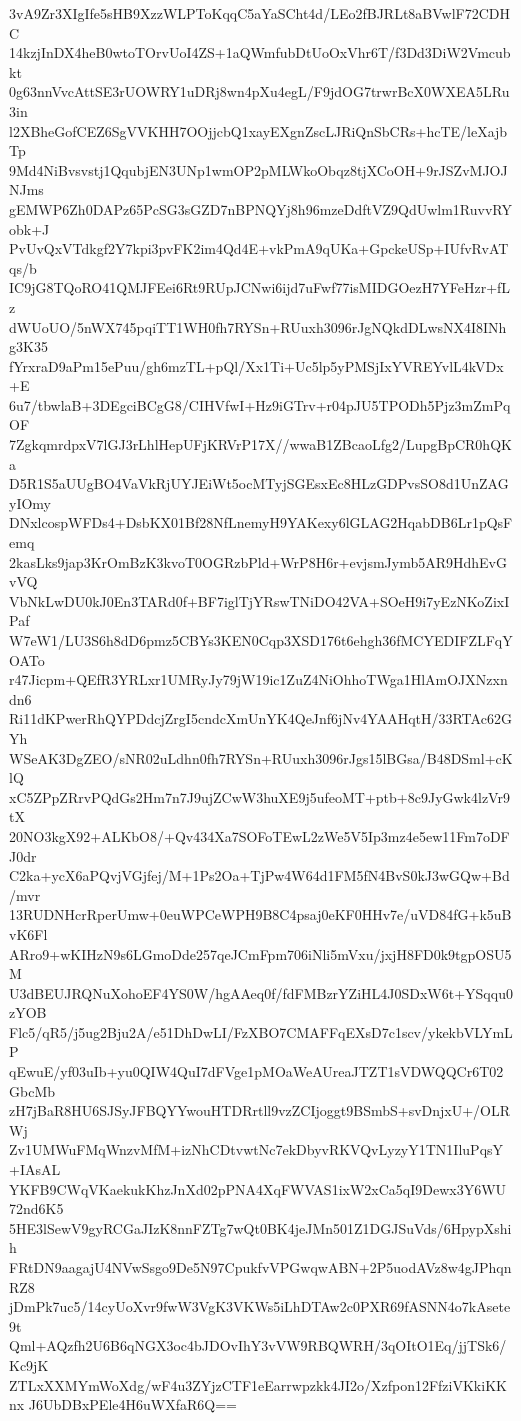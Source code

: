 3vA9Zr3XIgIfe5sHB9XzzWLPToKqqC5aYaSCht4d/LEo2fBJRLt8aBVwlF72CDHC
14kzjInDX4heB0wtoTOrvUoI4ZS+1aQWmfubDtUoOxVhr6T/f3Dd3DiW2Vmcubkt
0g63nnVvcAttSE3rUOWRY1uDRj8wn4pXu4egL/F9jdOG7trwrBcX0WXEA5LRu3in
l2XBheGofCEZ6SgVVKHH7OOjjcbQ1xayEXgnZscLJRiQnSbCRs+hcTE/leXajbTp
9Md4NiBvsvstj1QqubjEN3UNp1wmOP2pMLWkoObqz8tjXCoOH+9rJSZvMJOJNJms
gEMWP6Zh0DAPz65PcSG3sGZD7nBPNQYj8h96mzeDdftVZ9QdUwlm1RuvvRYobk+J
PvUvQxVTdkgf2Y7kpi3pvFK2im4Qd4E+vkPmA9qUKa+GpckeUSp+IUfvRvATqs/b
IC9jG8TQoRO41QMJFEei6Rt9RUpJCNwi6ijd7uFwf77isMIDGOezH7YFeHzr+fLz
dWUoUO/5nWX745pqiTT1WH0fh7RYSn+RUuxh3096rJgNQkdDLwsNX4I8INhg3K35
fYrxraD9aPm15ePuu/gh6mzTL+pQl/Xx1Ti+Uc5lp5yPMSjIxYVREYvlL4kVDx+E
6u7/tbwlaB+3DEgciBCgG8/CIHVfwI+Hz9iGTrv+r04pJU5TPODh5Pjz3mZmPqOF
7ZgkqmrdpxV7lGJ3rLhlHepUFjKRVrP17X//wwaB1ZBcaoLfg2/LupgBpCR0hQKa
D5R1S5aUUgBO4VaVkRjUYJEiWt5ocMTyjSGEsxEc8HLzGDPvsSO8d1UnZAGyIOmy
DNxlcospWFDs4+DsbKX01Bf28NfLnemyH9YAKexy6lGLAG2HqabDB6Lr1pQsFemq
2kasLks9jap3KrOmBzK3kvoT0OGRzbPld+WrP8H6r+evjsmJymb5AR9HdhEvGvVQ
VbNkLwDU0kJ0En3TARd0f+BF7iglTjYRswTNiDO42VA+SOeH9i7yEzNKoZixIPaf
W7eW1/LU3S6h8dD6pmz5CBYs3KEN0Cqp3XSD176t6ehgh36fMCYEDIFZLFqYOATo
r47Jicpm+QEfR3YRLxr1UMRyJy79jW19ic1ZuZ4NiOhhoTWga1HlAmOJXNzxndn6
Ri11dKPwerRhQYPDdcjZrgI5cndcXmUnYK4QeJnf6jNv4YAAHqtH/33RTAc62GYh
WSeAK3DgZEO/sNR02uLdhn0fh7RYSn+RUuxh3096rJgs15lBGsa/B48DSml+cKlQ
xC5ZPpZRrvPQdGs2Hm7n7J9ujZCwW3huXE9j5ufeoMT+ptb+8c9JyGwk4lzVr9tX
20NO3kgX92+ALKbO8/+Qv434Xa7SOFoTEwL2zWe5V5Ip3mz4e5ew11Fm7oDFJ0dr
C2ka+ycX6aPQvjVGjfej/M+1Ps2Oa+TjPw4W64d1FM5fN4BvS0kJ3wGQw+Bd/mvr
13RUDNHcrRperUmw+0euWPCeWPH9B8C4psaj0eKF0HHv7e/uVD84fG+k5uBvK6Fl
ARro9+wKIHzN9s6LGmoDde257qeJCmFpm706iNli5mVxu/jxjH8FD0k9tgpOSU5M
U3dBEUJRQNuXohoEF4YS0W/hgAAeq0f/fdFMBzrYZiHL4J0SDxW6t+YSqqu0zYOB
Flc5/qR5/j5ug2Bju2A/e51DhDwLI/FzXBO7CMAFFqEXsD7c1scv/ykekbVLYmLP
qEwuE/yf03uIb+yu0QIW4QuI7dFVge1pMOaWeAUreaJTZT1sVDWQQCr6T02GbcMb
zH7jBaR8HU6SJSyJFBQYYwouHTDRrtll9vzZCIjoggt9BSmbS+svDnjxU+/OLRWj
Zv1UMWuFMqWnzvMfM+izNhCDtvwtNc7ekDbyvRKVQvLyzyY1TN1IluPqsY+IAsAL
YKFB9CWqVKaekukKhzJnXd02pPNA4XqFWVAS1ixW2xCa5qI9Dewx3Y6WU72nd6K5
5HE3lSewV9gyRCGaJIzK8nnFZTg7wQt0BK4jeJMn501Z1DGJSuVds/6HpypXshih
FRtDN9aagajU4NVwSsgo9De5N97CpukfvVPGwqwABN+2P5uodAVz8w4gJPhqnRZ8
jDmPk7uc5/14cyUoXvr9fwW3VgK3VKWs5iLhDTAw2c0PXR69fASNN4o7kAsete9t
Qml+AQzfh2U6B6qNGX3oc4bJDOvIhY3vVW9RBQWRH/3qOItO1Eq/jjTSk6/Kc9jK
ZTLxXXMYmWoXdg/wF4u3ZYjzCTF1eEarrwpzkk4JI2o/Xzfpon12FfziVKkiKKnx
J6UbDBxPEle4H6uWXfaR6Q==
